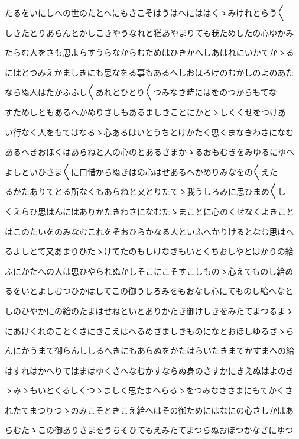 \documentclass[a4paper,11pt,landscape]{ltjtarticle}
\begin{document}
たるをいにしへの世のたとへにもさこそはうはへにははくゝみけれとらう〱
\par\medskip
しきたとりあらんとかしこきやうなれと猶あやまりても我ためしたの心ゆかみ
\par\medskip
たらむ人をさも思よらすうらなからむためはひきかへしあはれにいかてかゝる
\par\medskip
にはとつみえかましきにも思なをる事もあるへしおほろけのむかしのよのあた
\par\medskip
ならぬ人はたかふふし〱あれとひとり〱つみなき時にはをのつからもてな
\par\medskip
すためしともあるへかめりさしもあるましきことにかとゝしくくせをつけあ
\par\medskip
い行なく人をもてはなるゝ心あるはいとうちとけかたく思くまなきわさになむ
\par\medskip
あるへきおほくはあらねと人の心のとあるさまかゝるおもむきをみゆるにゆへ
\par\medskip
よしといひさま〱に口惜からぬきはの心はせあるへかめりみなをの〱えた
\par\medskip
るかたありてとる所なくもあらねと又とりたてゝ我うしろみに思ひまめ〱し
\par\medskip
くえらひ思はんにはありかたきわさになむたゝまことに心のくせなくよきこと
\par\medskip
はこのたいをのみなむこれをそおひらかなる人といふへかりけるとなむ思はへ
\par\medskip
るよしとて又あまりひたゝけてたのもしけなきもいとくちおしやとはかりの給
\par\medskip
ふにかたへの人は思ひやられぬかしそこにこそすこしものゝ心えてものし給め
\par\medskip
るをいとよしむつひかはしてこの御うしろみをもおなし心にてものし給へなと
\par\medskip
しのひやかにの給のたまはせねといとありかたき御けしきをみたてまつるまゝ
\par\medskip
にあけくれのことくさにきこえはへるめさましきものになとおほしゆるさゝら
\par\medskip
んにかうまて御らんししるへきにもあらぬをかたはらいたきまてかすまへの給
\par\medskip
はすれはかへりてはまはゆくさへなむかすならぬ身のさすかにきえぬはよのき
\par\medskip
ゝみゝもいとくるしくつゝましく思たまへらるゝをつみなきさまにもてかくさ
\par\medskip
れたてまつりつゝのみこそときこえ給へはその御ためにはなにの心さしかはあ
\par\medskip
らむたゝこの御ありさまをうちそひてもえみたてまつらぬおほつかなさにゆつ
\end{document}
